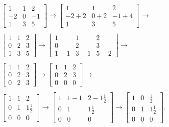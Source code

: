 \documentclass[12pt]{article}
\begin{document}
\begin{enumerate}
      \begin{align*}
        \begin{bmatrix}
           1 &  1 &  2\\
          -2 &  0 & -1\\
           1 &  3 &  5
        \end{bmatrix}
        \xrightarrow{}
        \begin{bmatrix}
           1     &  1     &  2\\
          -2 + 2 &  0 + 2 & -1 + 4\\
           1     &  3     &  5
        \end{bmatrix}
        \xrightarrow{}\\\\
        \begin{bmatrix}
           1 &  1 &  2\\
           0 &  2 &  3\\
           1 &  3 &  5
        \end{bmatrix}
        \xrightarrow{}
        \begin{bmatrix}
           1     &  1     &  2\\
           0     &  2     &  3\\
           1 - 1 &  3 - 1 &  5 - 2
        \end{bmatrix}
        \xrightarrow{}\\\\
        \begin{bmatrix}
           1 &  1 &  2\\
           0 &  2 &  3\\
           0 &  2 &  3
        \end{bmatrix}
        \xrightarrow{}
        \begin{bmatrix}
           1 &  1 &  2\\
           0 &  2 &  3\\
           0 &  0 &  0
        \end{bmatrix}
        \xrightarrow{}\\\\
        \begin{bmatrix}
           1 &  1 &  2\\
           0 &  1 &  1\frac{1}{2}\\
           0 &  0 &  0
        \end{bmatrix}
        \xrightarrow{}
        \begin{bmatrix}
           1 &  1 - 1 &  2 - 1\frac{1}{2}\\
           0 &  1     &  1\frac{1}{2}\\
           0 &  0     &  0
        \end{bmatrix}
        \xrightarrow{}
        \begin{bmatrix}
           1 &  0 &  \frac{1}{2}\\
           0 &  1 &  1\frac{1}{2}\\
           0 &  0 &  0
        \end{bmatrix}.
      \end{align*}


\end{enumerate}
\end{document}
